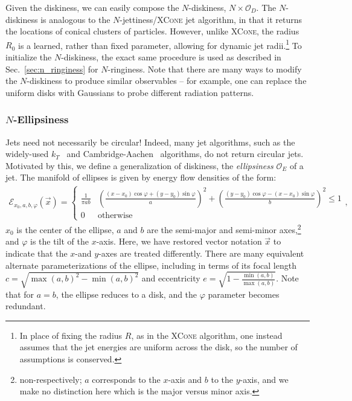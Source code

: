 \documentclass[letterpaper,11pt]{article}
\newcommand{\E}{\mathcal{E}}
\renewcommand{\O}{\mathcal{O}}
\DeclareRobustCommand{\Sec}[1]{Sec.~\ref{sec:#1}}
\begin{document}
Given the diskiness, we can easily compose the $N$-diskiness, $N\times\O_D$. The $N$-diskiness is analogous to the $N$-jettiness/\textsc{XCone} jet algorithm, in that it returns the locations of conical clusters of particles. However, unlike \textsc{XCone}, the radius $R_0$ is a learned, rather than fixed parameter, allowing for dynamic jet radii.\footnote{In place of fixing the radius $R$, as in the \textsc{XCone} algorithm, one instead assumes that the jet energies are uniform across the disk, so the number of assumptions is conserved.} To initialize the $N$-diskiness, the exact same procedure is used as described in \Sec{n_ringiness} for $N$-ringiness. Note that there are many ways to modify the $N$-diskiness to produce similar observables -- for example, one can replace the uniform disks with Gaussians to probe different radiation patterns. 


\subsubsection{$N$-Ellipsiness}\label{sec:n_ellipsiness}

Jets need not necessarily be circular! Indeed, many jet algorithms, such as the widely-used $k_T$~\cite{Cacciari:2008gp} and Cambridge-Aachen~\cite{Dokshitzer:1997in, Wobisch:1998wt} algorithms, do not return circular jets. Motivated by this, we define a generalization of diskiness, the \emph{ellipsiness} $\O_E$ of a jet. The manifold of ellipses is given by energy flow densities of the form:
%
\begin{align}
    \E_{x_0, a, b, \varphi}(\Vec{x}) =\begin{cases} 
      \frac{1}{\pi ab} & \left(\frac{(x-x_0)\cos\varphi + (y-y_0)\sin\varphi}{a}\right)^2 + \left(\frac{(y-y_0)\cos\varphi - (x-x_0)\sin\varphi}{b}\right)^2\leq 1 \\
      0 & \text{otherwise}   
      \end{cases},
\end{align}
%
$x_0$ is the center of the ellipse, $a$ and $b$ are the semi-major and semi-minor axes,\footnote{non-respectively; $a$ corresponds to the $x$-axis and $b$ to the $y$-axis, and we make no distinction here which is the major versus minor axis.} and $\varphi$ is the tilt of the $x$-axis. Here, we have restored vector notation $\Vec{x}$ to indicate that the $x$-and $y$-axes are treated differently. There are many equivalent alternate parameterizations of the ellipse, including in terms of its focal length $c = \sqrt{\max(a,b)^2 - \min(a,b)^2}$ and eccentricity $e = \sqrt{1 - \frac{\min(a,b)}{\max(a,b)}}$. Note that for $a = b$, the ellipse reduces to a disk, and the $\varphi$ parameter becomes redundant.  
\end{document}
